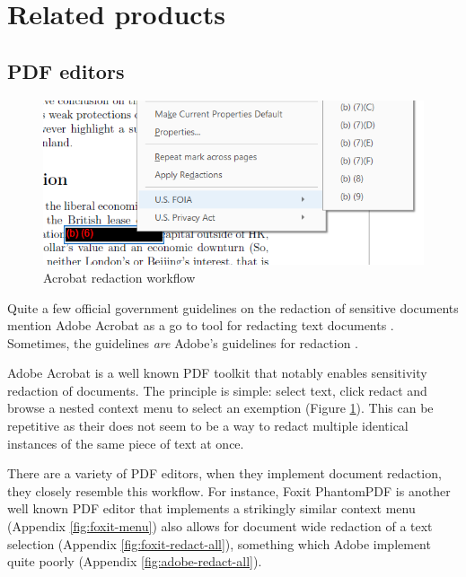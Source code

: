 \documentclass{l4proj}
\begin{document}
\section{Related products}

\subsection{PDF editors}

\begin{figure}
    \includegraphics[width=\linewidth]{images/related_products/adobe_redaction.png}
    \caption{Acrobat redaction workflow}
    \vspace{-20pt}
    \label{fig:adobe-redaction}
\end{figure}

Quite a few official government guidelines on the redaction of sensitive documents mention Adobe Acrobat as a go to tool for redacting text documents \autocite{thenationalarchivesRedactionToolkitPaper2016}.
Sometimes, the guidelines \textit{are} Adobe's guidelines for redaction \autocite{scottishgovernmentRedactingInformation2019}.

Adobe Acrobat is a well known PDF toolkit that notably enables sensitivity redaction of documents.
The principle is simple: select text, click redact and browse a nested context menu to select an exemption (Figure \ref{fig:adobe-redaction}).
This can be repetitive as their does not seem to be a way to redact multiple identical instances of the same piece of text at once.

There are a variety of PDF editors, when they implement document redaction, they closely resemble this workflow.
For instance, Foxit PhantomPDF is another well known PDF editor that implements a strikingly similar context menu (Appendix \ref{fig:foxit-menu}) also allows for document wide redaction of a text selection (Appendix \ref{fig:foxit-redact-all}), something which Adobe implement quite poorly (Appendix \ref{fig:adobe-redact-all}).
\end{document}
